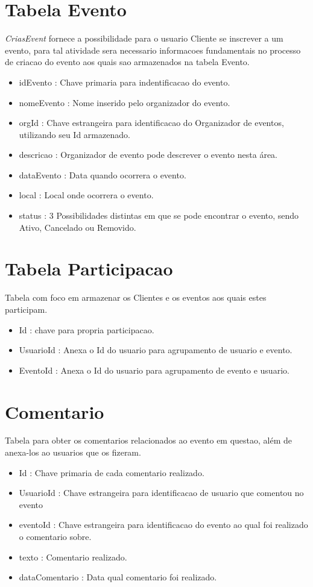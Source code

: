 \section{Tabela Evento}
\textit{CriasEvent} fornece a possibilidade para o usuario Cliente se inscrever a um evento, para tal atividade sera necessario informacoes fundamentais no processo de criacao do evento aos quais sao armazenados na tabela Evento.

\begin{itemize}
    \item idEvento : Chave primaria para indentificacao do evento.
    \item nomeEvento : Nome inserido pelo organizador do evento.
    \item orgId : Chave estrangeira para identificacao do Organizador de eventos, utilizando seu Id armazenado.
    \item descricao : Organizador de evento pode descrever o evento nesta área.
    \item dataEvento : Data quando ocorrera o evento.
    \item local : Local onde ocorrera o evento.
    \item status : 3 Possibilidades distintas em que se pode encontrar o evento, sendo Ativo, Cancelado ou Removido.
\end{itemize}

\section{Tabela Participacao}
Tabela com foco em armazenar os Clientes e os eventos aos quais estes participam.
\begin{itemize}
    \item Id : chave para propria participacao.
    \item UsuarioId : Anexa o Id do usuario para agrupamento de usuario e evento.
    \item EventoId : Anexa o Id do usuario para agrupamento de evento e usuario.
\end{itemize}

\section{Comentario}
Tabela para obter os comentarios relacionados ao evento em questao, além de anexa-los ao usuarios que os fizeram.

\begin{itemize}
    \item Id : Chave primaria de cada comentario realizado.
    \item UsuarioId : Chave estrangeira para identificacao de usuario que comentou no evento
    \item eventoId : Chave estrangeira para identificacao do evento ao qual foi realizado o comentario sobre.
    \item texto : Comentario realizado.
    \item dataComentario : Data qual comentario foi realizado.
\end{itemize}

